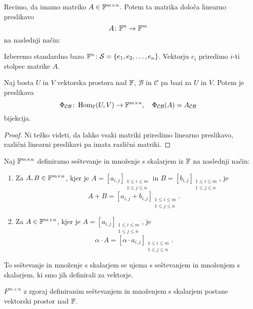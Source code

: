 \documentclass[12pt, a4paper]{article}
\begin{document}
Recimo, da imamo matriko $A\in\mathbb{F}^{m\times n}$. Potem ta matrika določa linearno preslikavo
\[
A\colon\mathbb{F}^n\to\mathbb{F}^m
\]
na naslednji način:

Izberemo standardno bazo $\mathbb{F}^n\colon\mathcal{S}=\left\{e_1,e_2,\dots,e_n\right\}$. Vektorju $e_i$ priredimo $i$-ti stolpec matrike $A$.

\begin{trditev}
Naj bosta $U$ in $V$ vektorska prostora nad $\mathbb{F}$, $\mathcal{B}$ in $\mathcal{C}$ pa bazi za $U$ in $V$. Potem je preslikava
\[
\Phi_{\mathcal{CB}}\colon\operatorname{Hom}_{\mathbb{F}}(U,V)\to\mathbb{F}^{m\times n},\quad \Phi_{\mathcal{CB}}(A)=A_{\mathcal{CB}}
\]
bijekcija.
\end{trditev}

\begin{proof}
Ni težko videti, da lahko vsaki matriki priredimo linearno preslikavo, različni linearni preslikavi pa imata različni matriki.
\end{proof}

\begin{definicija}
Naj $\mathbb{F}^{m\times n}$ definiramo seštevanje in množenje s skalarjem iz $\mathbb{F}$ na naslednji način:

\begin{enumerate}[label=\roman*)]
\item Za $A,B\in\mathbb{F}^{m\times n}$, kjer je $A=[a_{i,j}]_{
\substack{
1\leq i\leq m \\
1\leq j\leq n}}$ in $B=[b_{i,j}]_{
\substack{
1\leq i\leq m \\
1\leq j\leq n}}$, je
\[
A+B=[a_{i,j}+b_{i,j}]_{
\substack{
1\leq i\leq m \\
1\leq j\leq n}}.
\]
\item Za $A\in\mathbb{F}^{m\times n}$, kjer je $A=[a_{i,j}]_{
\substack{
1\leq i\leq m \\
1\leq j\leq n}}$, je
\[
\alpha\cdot A=[\alpha\cdot a_{i,j}]_{
\substack{
1\leq i\leq m \\
1\leq j\leq n}}.
\]
\end{enumerate}
\end{definicija}

\begin{opomba}
To seštevanje in množenje s skalarjem se ujema s seštevanjem in množenjem s skalarjem, ki smo jih definirali za vektorje.
\end{opomba}

\begin{trditev}
$F^{m\times n}$ z zgoraj definiranim seštevanjem in množenjem s skalarjem postane vektorski prostor nad $\mathbb{F}$.
\end{trditev}
\end{document}
